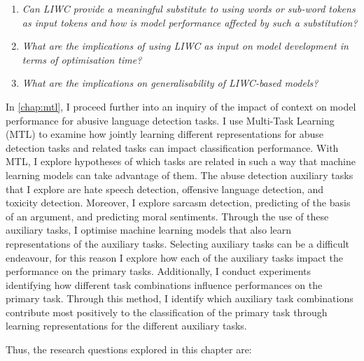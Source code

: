 \begin{center}
\begin{minipage}{0.9\textwidth}
\vspace{5mm}
    \begin{enumerate}[start=3, label={\textbf{RQ \arabic*}}]
        \item{\textit{Can LIWC provide a meaningful substitute to using words or sub-word tokens as input tokens and how is model performance affected by such a substitution?}}
        \item{\textit{What are the implications of using LIWC as input on model development in terms of optimisation time?}}
        \item{\textit{What are the implications on generalisability of LIWC-based models?}}
    \end{enumerate}
    \vspace{5mm}
\end{minipage}
\end{center}

In \cref{chap:mtl}, I proceed further into an inquiry of the impact of context on model performance for abusive language detection tasks.
I use Multi-Task Learning (MTL) to examine how jointly learning different representations for abuse detection tasks and related tasks can impact classification performance.
With MTL, I explore hypotheses of which tasks are related in such a way that machine learning models can take advantage of them.
The abuse detection auxiliary tasks that I explore are hate speech detection, offensive language detection, and toxicity detection.
Moreover, I explore sarcasm detection, predicting of the basis of an argument, and predicting moral sentiments.
Through the use of these auxiliary tasks, I optimise machine learning models that also learn representations of the auxiliary tasks.
Selecting auxiliary tasks can be a difficult endeavour, for this reason I explore how each of the auxiliary tasks impact the performance on the primary tasks.
Additionally, I conduct experiments identifying how different task combinations influence performances on the primary task.
Through this method, I identify which auxiliary task combinations contribute most positively to the classification of the primary task through learning representations for the different auxiliary tasks.

Thus, the research questions explored in this chapter are:

